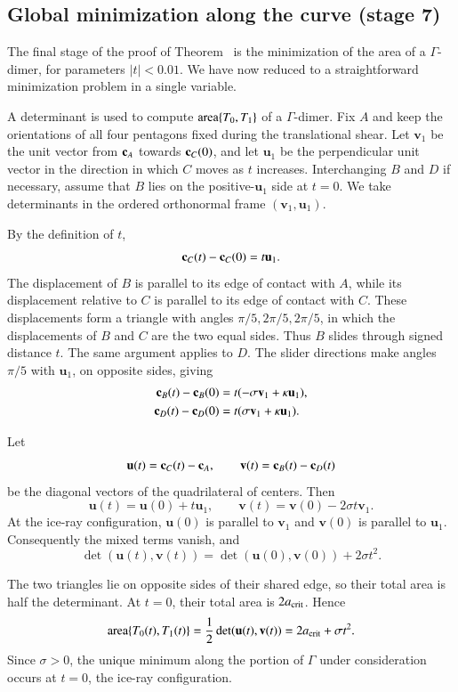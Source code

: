 \subsection{Global minimization along the curve (stage 7)}

The final stage of the proof of Theorem~ is the
minimization of the area of a $\Gamma$-dimer, for parameters
$|t|<0.01$.  We have now reduced to a straightforward minimization problem in a
single variable. 

A determinant is used to compute ${\operatorname{area}}\{T_0,T_1\}$ of a $\Gamma$-dimer.
Fix $A$ and keep the
orientations of all four pentagons fixed during the translational
shear. Let $\mathbf v_1$ be the unit vector from ${\mathbf c}_A$ towards
${\mathbf c}_C(0)$, and let $\mathbf u_1$ be the perpendicular unit vector in
the direction in which $C$ moves as $t$ increases. Interchanging
$B$ and $D$ if necessary, assume that $B$ lies on the
positive-$\mathbf u_1$ side at $t=0$. We take determinants in the
ordered orthonormal frame $(\mathbf v_1,\mathbf u_1)$.

By the definition of $t$,
\[
{\mathbf c}_C(t)-{\mathbf c}_C(0)=t\mathbf u_1.
\]
The displacement of $B$ is parallel to its edge of contact with
$A$, while its displacement relative to $C$ is parallel to its
edge of contact with $C$. These displacements form a triangle
with angles $\pi/5,2\pi/5,2\pi/5$, in which the displacements of
$B$ and $C$ are the two equal sides. Thus $B$ slides through
signed distance $t$. The same argument applies to $D$. The
slider directions make angles $\pi/5$ with $\mathbf u_1$, on
opposite sides, giving
\[
\begin{aligned}
{\mathbf c}_B(t)-{\mathbf c}_B(0)&=t(-\sigma\mathbf v_1+\kappa\mathbf u_1),\\
{\mathbf c}_D(t)-{\mathbf c}_D(0)&=t(\sigma\mathbf v_1+\kappa\mathbf u_1).
\end{aligned}
\]

Let
\[
\mathbf u(t)={\mathbf c}_C(t)-{\mathbf c}_A,\qquad
\mathbf v(t)={\mathbf c}_B(t)-{\mathbf c}_D(t)
\]
be the diagonal vectors of the quadrilateral of centers. Then
\[
\mathbf u(t)=\mathbf u(0)+t\mathbf u_1,\qquad
\mathbf v(t)=\mathbf v(0)-2\sigma t\mathbf v_1.
\]
At the ice-ray configuration, $\mathbf u(0)$ is parallel to
$\mathbf v_1$ and $\mathbf v(0)$ is parallel to $\mathbf u_1$.
Consequently the mixed terms vanish, and
\[
\det(\mathbf u(t),\mathbf v(t))
=
\det(\mathbf u(0),\mathbf v(0))+2\sigma t^2.
\]

The two triangles lie on opposite sides of their shared edge,
so their total area is half the determinant. At
$t=0$, their total area is $2a_\text{crit}$. Hence
\[
{\operatorname{area}}\{T_0(t),T_1(t)\}
=
\frac12\det(\mathbf u(t),\mathbf v(t))
=
2a_\text{crit}+\sigma t^2.
\]
Since $\sigma>0$, the unique minimum along the portion of
$\Gamma$ under consideration occurs at $t=0$, the ice-ray
configuration.

